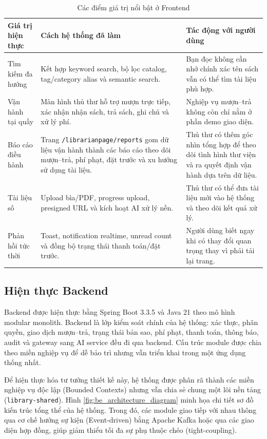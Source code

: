 \begin{table}[H]
\centering
\small
\begin{tabularx}{\textwidth}{|p{3.4cm}|p{6.6cm}|X|}
\hline
\textbf{Giá trị hiện thực} & \textbf{Cách hệ thống đã làm} & \textbf{Tác động với người dùng} \\
\hline
Tìm kiếm đa hướng &
Kết hợp keyword search, bộ lọc catalog, tag/category alias và semantic search. &
Bạn đọc không cần nhớ chính xác tên sách vẫn có thể tìm tài liệu phù hợp. \\
\hline
Vận hành tại quầy &
Màn hình thủ thư hỗ trợ mượn trực tiếp, xác nhận nhận sách, trả sách, ghi chú và xử lý phí. &
Nghiệp vụ mượn--trả không còn chỉ nằm ở phần demo giao diện. \\
\hline
Báo cáo điều hành &
Trang \texttt{/librarianpage/reports} gom dữ liệu vận hành thành các báo cáo
theo dõi mượn--trả, phí phạt, đặt trước và xu hướng sử dụng tài liệu. &
Thủ thư có thêm góc nhìn tổng hợp để theo dõi tình hình thư viện và ra quyết
định vận hành dựa trên dữ liệu. \\
\hline
Tài liệu số &
Upload bìa/PDF, progress upload, presigned URL và kích hoạt AI xử lý nền. &
Thủ thư có thể đưa tài liệu mới vào hệ thống và theo dõi kết quả xử lý. \\
\hline
Phản hồi tức thời &
Toast, notification realtime, unread count và đồng bộ trạng thái thanh toán/đặt trước. &
Người dùng biết ngay khi có thay đổi quan trọng thay vì phải tải lại trang. \\
\hline
\end{tabularx}
\caption{Các điểm giá trị nổi bật ở Frontend}
\label{tab:fe_value_highlights}
\end{table}

\subsection{Hiện thực Backend}

Backend được hiện thực bằng Spring Boot 3.3.5 và Java 21 theo mô hình modular
monolith. Backend là lớp kiểm soát chính của hệ thống: xác thực, phân quyền,
giao dịch mượn--trả, trạng thái bản sao, phí phạt, thanh toán, thông báo, audit
và gateway sang AI service đều đi qua backend. Cấu trúc module được chia theo
miền nghiệp vụ để dễ bảo trì nhưng vẫn triển khai trong một ứng dụng thống nhất.


Để hiện thực hóa tư tưởng thiết kế này, hệ thống được phân rã thành các miền nghiệp vụ độc lập (Bounded Contexts) nhưng vẫn chia sẻ chung một lõi nền tảng (\texttt{library-shared}). Hình \ref{fig:be_architecture_diagram} minh họa chi tiết sơ đồ kiến trúc tổng thể của hệ thống. Trong đó, các module giao tiếp với nhau thông qua cơ chế hướng sự kiện (Event-driven) bằng Apache Kafka hoặc qua các giao diện hợp đồng, giúp giảm thiểu tối đa sự phụ thuộc chéo (tight-coupling).

